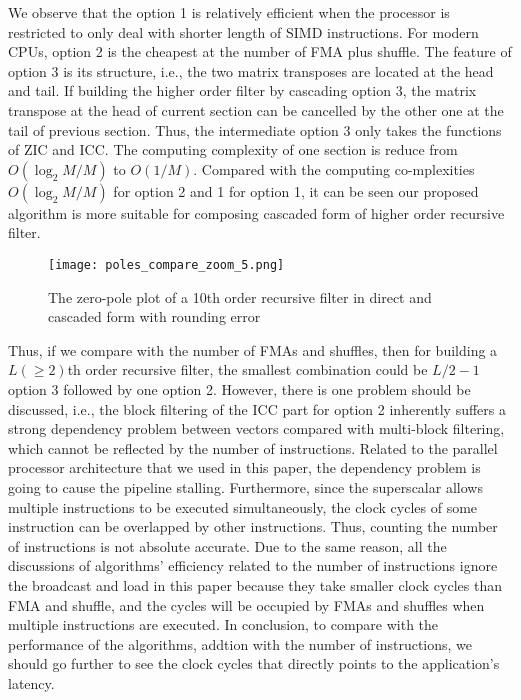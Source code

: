 We observe 
that
the option 1 is relatively efficient when the processor is restricted to only deal with shorter length of SIMD instructions.
For modern CPUs, option 2 is the cheapest at the number of FMA plus shuffle.
The feature of option 3 is its structure, i.e.,
the two matrix transposes are located at the head and tail. 
If building the higher order filter by cascading option 3,
the matrix transpose at the head of current section can be cancelled by
the other one at the tail of previous section.
Thus, the intermediate option 3 only takes the functions of ZIC and ICC.
The computing complexity of one section is reduce from $O(\log_2M/M)$ to $O(1/M)$.
Compared with the computing co-mplexities $O(\log_2M/M)$ for option 2 and 1 for option 1,
it can be seen our proposed algorithm
is more suitable for composing cascaded form of higher order recursive filter.


\begin{figure}[t]
    \centerline{\texttt{[image: poles\_compare\_zoom\_5.png]}}
    \caption{The zero-pole plot of a 10th order recursive filter in direct and cascaded form with rounding error}
    \label{fig:poles_compare_zoom}
\end{figure}

Thus, if we compare with the number of FMAs and shuffles,
then for building a $L(\geq 2)$th order recursive filter,
the smallest combination could be $L/2{-}1$ option 3 followed by one option 2.
However, there is one problem should be discussed,
i.e., the block filtering of the ICC part for option 2 inherently suffers a strong dependency
problem between vectors compared with multi-block filtering, which cannot be reflected by the number of instructions. 
Related to the parallel processor architecture that we used in this paper,
the dependency problem is going to cause the pipeline stalling.
Furthermore, since the superscalar allows 
multiple instructions to be executed simultaneously,
the clock cycles of some instruction can be overlapped by other 
instructions.
Thus, counting the number of instructions is not absolute accurate.
Due to the same reason, all the discussions of algorithms' efficiency
related to the number of instructions ignore the broadcast and load 
in this paper
because they take smaller clock cycles
than FMA and shuffle, and the cycles
will be occupied by FMAs and shuffles when
multiple instructions are executed.  
In conclusion, to compare with the performance of the algorithms, 
addtion with the number of instructions,
we should go further to see the clock cycles that
directly points to the application's latency.


